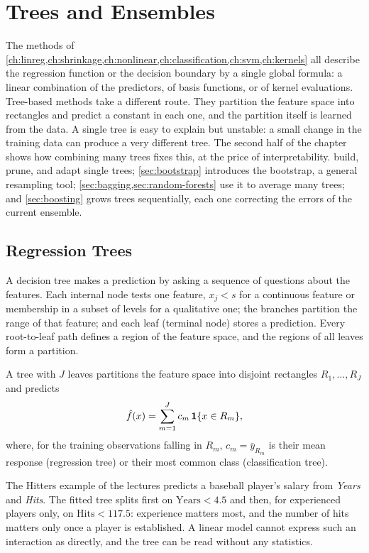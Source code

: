 \chapter{Trees and Ensembles}\label{ch:trees}

The methods of \cref{ch:linreg,ch:shrinkage,ch:nonlinear,ch:classification,ch:svm,ch:kernels} all describe the regression function or the decision boundary by a single global formula: a linear combination of the predictors, of basis functions, or of kernel evaluations. Tree-based methods take a different route. They partition the feature space into rectangles and predict a constant in each one, and the partition itself is learned from the data. A single tree is easy to explain but unstable: a small change in the training data can produce a very different tree. The second half of the chapter shows how combining many trees fixes this, at the price of interpretability.  build, prune, and adapt single trees; \cref{sec:bootstrap} introduces the bootstrap, a general resampling tool; \cref{sec:bagging,sec:random-forests} use it to average many trees; and \cref{sec:boosting} grows trees sequentially, each one correcting the errors of the current ensemble.

\section{Regression Trees}\label{sec:regression-trees}

A decision tree makes a prediction by asking a sequence of questions about the features. Each internal node tests one feature, $x_j<s$ for a continuous feature or membership in a subset of levels for a qualitative one; the branches partition the range of that feature; and each leaf (terminal node) stores a prediction. Every root-to-leaf path defines a region of the feature space, and the regions of all leaves form a partition.

\begin{definition}\label{def:tree}
A tree with $J$ leaves partitions the feature space into disjoint rectangles $R_1,\dots,R_J$ and predicts
\[
\hat f(x)=\sum_{m=1}^J c_m\,\mathbf{1}\{x\in R_m\},
\]
where, for the training observations falling in $R_m$, $c_m=\bar y_{R_m}$ is their mean response (regression tree) or their most common class (classification tree).
\end{definition}

The Hitters example of the lectures predicts a baseball player's salary from \emph{Years} and \emph{Hits}. The fitted tree splits first on $\text{Years}<4.5$ and then, for experienced players only, on $\text{Hits}<117.5$: experience matters most, and the number of hits matters only once a player is established. A linear model cannot express such an interaction as directly, and the tree can be read without any statistics.

